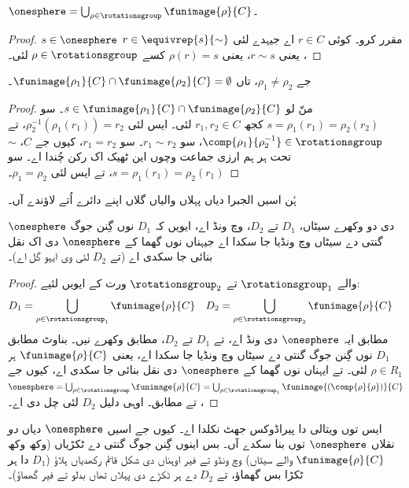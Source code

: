 \documentclass[../../../include/open-logic-section]{subfiles}
\begin{document}
\begin{lem}
$\onesphere = \bigcup_{\rho \in \rotationsgroup} \funimage{\rho}{C}$۔
\end{lem}

\begin{proof}
$s \in \onesphere$ مقرر کرو۔ کوئی $r \in C$ اے جیہدے لئی $r \in
\equivrep{s}{\sim}$، یعنی $r \sim s$، یعنی $\rho(r) = s$ کسے $\rho \in \rotationsgroup$ لئی۔
\end{proof}

\begin{lem}
جے $\rho_1 \neq \rho_2$، تاں $\funimage{\rho_1}{C} \cap \funimage{\rho_2}{C} = \emptyset$۔
\end{lem}

\begin{proof}
منّ لو $s \in \funimage{\rho_{1}}{C} \cap \funimage{\rho_{2}}{C}$۔ سو
$s = \rho_{1}(r_{1}) = \rho_{2}(r_{2})$ کجھ $r_{1}, r_{2} \in C$ لئی۔
ایس لئی $\rho^{-1}_2(\rho_1(r_1)) = r_2$، تے
$\comp{\rho_1}{\rho^{-1}_2} \in \rotationsgroup$، سو $r_{1} \sim
r_{2}$۔ سو $r_1 = r_2$، کیوں جے $C$، $\sim$ تحت ہر ہم ارزی جماعت وچوں این ٹھیک اک رکن چُندا اے۔ سو $s = \rho_1(r_1) = \rho_2(r_1)$، تے ایس لئی $\rho_1 = \rho_2$۔
\end{proof}

ہُن اسیں الجبرا دیاں پہلاں والیاں گلاں اپنے دائرے اُتے لاؤندے آں۔

\begin{lem}
$\onesphere$ دی دو وکھرے سیٹاں، $D_{1}$ تے $D_{2}$، وچ ونڈ اے، ایویں کہ $D_{1}$ نوں گِنن جوگ گنتی دے سیٹاں وچ ونڈیا جا سکدا اے جیہناں نوں گھما کے $\onesphere$ دی اک نقل بنائی جا سکدی اے (تے $D_{2}$ لئی وی ایہو گل اے)۔
\end{lem}

\begin{proof}
 والے $\rotationsgroup_{1}$ تے $\rotationsgroup_{2}$ ورت کے ایویں لئیے:
\begin{align*}
	D_{1} &= \bigcup_{\rho \in \rotationsgroup_1} \funimage{\rho}{C} &
	D_{2} &= \bigcup_{\rho \in \rotationsgroup_2} \funimage{\rho}{C}
\end{align*}
 مطابق ایہ $\onesphere$ دی ونڈ اے، تے $D_1$ تے $D_2$،  مطابق وکھرے نیں۔ بناوٹ مطابق $D_1$ نوں گِنن جوگ گنتی دے سیٹاں وچ ونڈیا جا سکدا اے، یعنی $\funimage{\rho}{C}$ ہر $\rho \in R_1$ لئی۔ تے ایہناں نوں گھما کے $\onesphere$ دی نقل بنائی جا سکدی اے، کیوں جے $\onesphere = \bigcup_{\rho \in
\rotationsgroup}\funimage{\rho}{C} = \bigcup_{\rho \in
\rotationsgroup_1}\funimage{(\comp{\rho}{\rho})}{C}$،  تے  مطابق۔ اوہی دلیل $D_2$ لئی چل دی اے۔ \end{proof}\noindent ایس توں ویتالی دا پیراڈوکس جھٹ نکلدا اے۔ کیوں جے اسیں $\onesphere$ دیاں \emph{دو} نقلاں $\onesphere$ توں بنا سکدے آں۔ بس اینوں گِنن جوگ گنتی دے ٹکڑیاں (وکھ وکھ $\funimage{\rho}{C}$ والے سیٹاں) وچ ونڈو تے فیر اوہناں دی شکل قائم رکھدیاں ہلاؤ ($D_1$ دا ہر ٹکڑا بس گھماؤ، تے $D_2$ دے ہر ٹکڑے دی پہلاں تھاں بدلو تے فیر گھماؤ)۔
\end{document}
